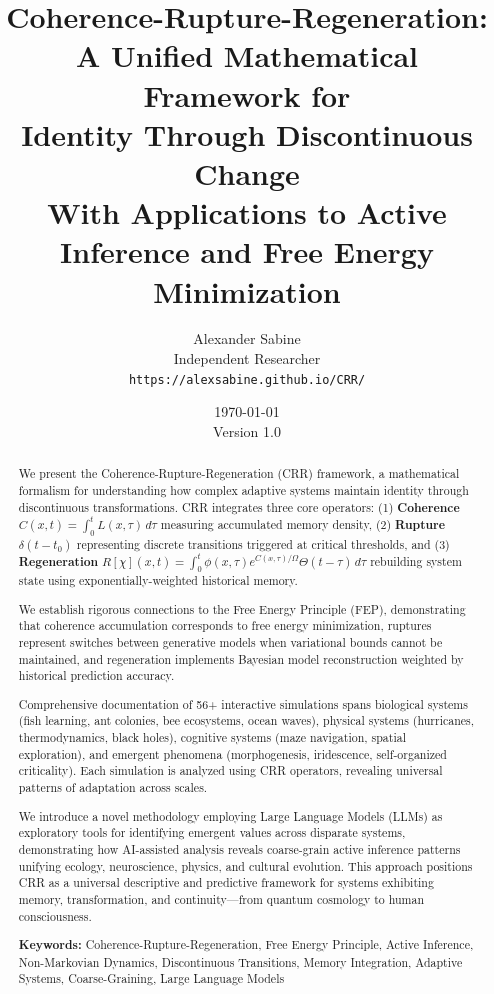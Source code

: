 \documentclass[11pt,a4paper]{article}
\title{\textbf{Coherence-Rupture-Regeneration:\\A Unified Mathematical Framework for\\Identity Through Discontinuous Change}\\[1em]
\large With Applications to Active Inference and Free Energy Minimization}
\author{Alexander Sabine\\
Independent Researcher\\
\texttt{https://alexsabine.github.io/CRR/}}
\date{\today\\[1em]Version 1.0}
\theoremstyle{definition}
\theoremstyle{remark}
\begin{document}
\maketitle

\begin{abstract}
We present the Coherence-Rupture-Regeneration (CRR) framework, a mathematical formalism for understanding how complex adaptive systems maintain identity through discontinuous transformations. CRR integrates three core operators: (1) \textbf{Coherence} $C(x,t) = \int_0^t L(x,\tau)\,d\tau$ measuring accumulated memory density, (2) \textbf{Rupture} $\delta(t-t_0)$ representing discrete transitions triggered at critical thresholds, and (3) \textbf{Regeneration} $R[\chi](x,t) = \int_0^t \phi(x,\tau) e^{C(x,\tau)/\Omega} \Theta(t-\tau)\,d\tau$ rebuilding system state using exponentially-weighted historical memory.

We establish rigorous connections to the Free Energy Principle (FEP), demonstrating that coherence accumulation corresponds to free energy minimization, ruptures represent switches between generative models when variational bounds cannot be maintained, and regeneration implements Bayesian model reconstruction weighted by historical prediction accuracy.

Comprehensive documentation of 56+ interactive simulations spans biological systems (fish learning, ant colonies, bee ecosystems, ocean waves), physical systems (hurricanes, thermodynamics, black holes), cognitive systems (maze navigation, spatial exploration), and emergent phenomena (morphogenesis, iridescence, self-organized criticality). Each simulation is analyzed using CRR operators, revealing universal patterns of adaptation across scales.

We introduce a novel methodology employing Large Language Models (LLMs) as exploratory tools for identifying emergent values across disparate systems, demonstrating how AI-assisted analysis reveals coarse-grain active inference patterns unifying ecology, neuroscience, physics, and cultural evolution. This approach positions CRR as a universal descriptive and predictive framework for systems exhibiting memory, transformation, and continuity—from quantum cosmology to human consciousness.

\textbf{Keywords:} Coherence-Rupture-Regeneration, Free Energy Principle, Active Inference, Non-Markovian Dynamics, Discontinuous Transitions, Memory Integration, Adaptive Systems, Coarse-Graining, Large Language Models
\end{abstract}
\end{document}
